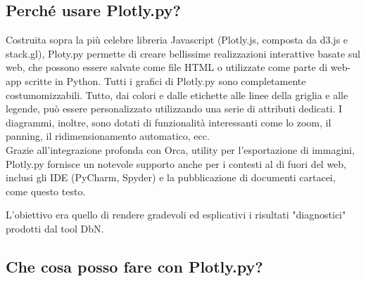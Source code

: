 \subsection{Perché usare Plotly.py?}
Costruita sopra la più celebre libreria Javascript (Plotly.js, composta da d3.js e stack.gl), 
Ploty.py permette di creare bellissime realizzazioni interattive basate sul web, che possono
essere salvate come file HTML o utilizzate come parte di web-app scritte in Python.
Tutti i grafici di Plotly.py sono completamente costumomizzabili. 
Tutto, dai colori e dalle etichette alle linee della griglia e alle legende, può essere personalizzato 
utilizzando una serie di attributi dedicati.
I diagrammi, inoltre, sono dotati di funzionalità interessanti come lo zoom, il panning, il ridimensionamento automatico, ecc. \\
Grazie all'integrazione profonda con Orca, utility per l'esportazione di immagini, Plotly.py
fornisce un notevole supporto anche per i contesti al di fuori del web, inclusi gli IDE (PyCharm, Spyder)
e la pubblicazione di documenti cartacei, come questo testo.

L'obiettivo era quello di rendere gradevoli ed esplicativi i risultati "diagnostici" prodotti dal tool DbN.

\subsection{Che cosa posso fare con Plotly.py?}
\inputminted{Python}{codice/IntroPlotly.py}






